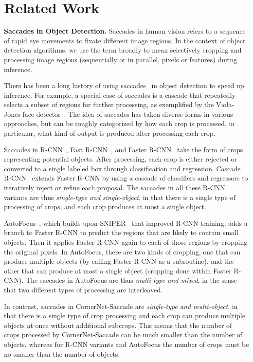 \documentclass{bmvc2k}
\begin{document}
\section{Related Work}
\smallskip \noindent \textbf{Saccades in Object Detection.} 
Saccades in human vision refers to a sequence of rapid eye movements to fixate different image regions. In the context of object detection algorithms, we use the term broadly to mean selectively cropping and processing image regions (sequentially or in parallel, pixels or features) during inference. 

There has been a long history of using saccades~\cite{gualdi2011multistage,pedersoli2010recursive,zhang2007real} in object detection to speed up inference. For example, a special case of saccades is a cascade that repeatedly selects a subset of regions for further processing, as exemplified by the Viola-Jones face detector~\cite{viola2001rapid}. 
The idea of saccades has taken diverse forms in various approaches, but can be roughly categorized by how each crop is processed, in particular, what kind of output is produced after processing each crop. 

Saccades in R-CNN~\cite{girshick2014rich}, Fast R-CNN~\cite{girshick2015fast}, and Faster R-CNN~\cite{ren2015faster} take the form of crops representing potential objects. After processing, each crop is either rejected or converted to a single labeled box through classification and regression. Cascade R-CNN~\cite{cai2018cascade} extends Faster R-CNN by using a cascade of classifiers and regressors to iteratively reject or refine each proposal. The saccades in all these R-CNN variants  are thus \emph{single-type and single-object}, in that there is a single type of processing of crops, and each crop produces at most a single object. 

AutoFocus~\cite{najibi2018autofocus}, which builds upon SNIPER~\cite{singh2018sniper} that improved R-CNN training, adds a branch to Faster R-CNN to predict the regions that are likely to contain small objects. Then it applies Faster R-CNN again to each of those regions by cropping the original pixels. In AutoFocus, there are two kinds of cropping, one that can produce multiple objects (by calling Faster R-CNN as a subroutine), and the other that can produce at most a single object (cropping done within Faster R-CNN). The saccades in AutoFocus are thus \emph{multi-type and mixed}, in the sense that two different types of processing are interleaved. 

In contrast, saccades in CornerNet-Saccade are \emph{single-type and multi-object}, in that there is a single type of crop processing and each crop can produce multiple objects at once without additional subcrops. This means that the number of crops processed by CornerNet-Saccade can be much smaller than the number of objects, whereas for R-CNN variants and AutoFocus the number of crops must be no smaller than the number of objects.
\end{document}
